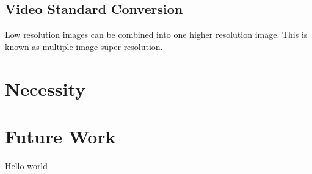 \documentclass{article}
\begin{document}
\subsection{Video Standard Conversion}
%
Low resolution images can be combined into one higher resolution
image. This is known as multiple image super resolution.
%
%
\section{Necessity}
\label{sec:necessity}
%
%
\section{Future Work}
\label{sec:future}
Hello world
%
\printbibliography
\end{document}
